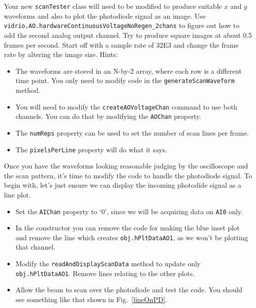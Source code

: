\documentclass[a4paper]{report}
\begin{document}
\noindent
Your new \texttt{scanTester} class will need to be modified to produce suitable $x$ and $y$ waveforms and also to plot the photodiode signal as an image. 
Use \texttt{vidrio.AO.hardwareContinuousVoltageNoRegen\_2chans} to figure out how to add the second analog output channel.
Try to produce square images at about 0.5 frames per second. 
Start off with a sample rate of 32E3 and change the frame rate by altering the image size.
Hints:
\begin{itemize}
    \setlength\itemsep{0.15em}
    \item The waveforms are stored in an N-by-2 array, where each row is a different time point. You only need to modify code in the \texttt{generateScanWaveform} method.
    \item You will need to modify the \texttt{createAOVoltageChan} command to use both channels. You can do that by modifying the \texttt{AOChan} property.
    \item The \texttt{numReps} property can be used to set the number of scan lines per frame.
    \item The \texttt{pixelsPerLine} property will do what it says. 
\end{itemize}

\noindent

Once you have the waveforms looking reasonable judging by the oscilloscope and the scan pattern, it's time to modify the code to handle the photodiode signal. 
To begin with, let's just ensure we can display the incoming photodide signal as a line plot.

\begin{itemize}
    \setlength\itemsep{0.15em}
    \item Set the \texttt{AIChan} property to `0', since we will be acquiring data on \texttt{AI0} only.
    \item In the constructor you can remove the code for making the blue inset plot and remove the line which creates \texttt{obj.hPltDataAO1}, as we won't be plotting that channel.
    \item Modify the \texttt{readAndDisplayScanData} method to update only \texttt{obj.hPltDataAO1}. Remove lines relating to the other plots. 
    \item Allow the beam to scan over the photodiode and test the code. 
    You should see something like that shown in Fig.~\ref{lineOnPD}. 
\end{itemize}

\noindent
\end{document}
